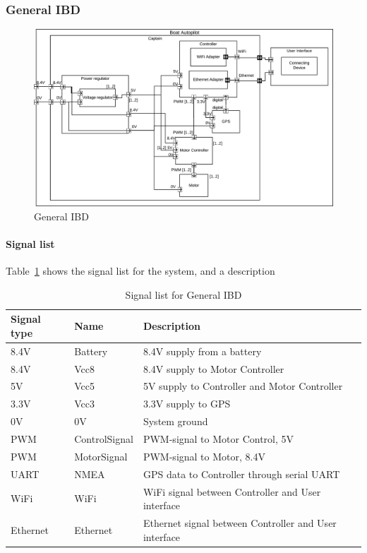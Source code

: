 \subsubsection{General IBD}
\label{sec:general_ibd}
\begin{figure}[H]
	\centering
	\includegraphics[width=1\linewidth]{Images/System_architecture/General_IBD}
	\caption{General IBD}
	\label{fig:general_ibd}
\end{figure}

\paragraph{Signal list}


Table~\ref{table:general_ibd} shows the signal list for the system, and a description
\begin{table}[htbp]
	\centering
	\begin{tabular}{|l|l|l|}
		\hline
		\textbf{Signal type} 	&\textbf{Name}		&\textbf{Description} \\\hline
		8.4V			&Battery	&8.4V supply from a battery\\\hline
		
		8.4V			&Vcc8		&8.4V supply to Motor Controller\\\hline
		5V			&Vcc5		&5V supply to Controller and Motor Controller\\\hline
		3.3V			&Vcc3		&3.3V supply to GPS\\\hline
		0V			&0V			&System ground\\\hline
		PWM	&ControlSignal	&PWM-signal to Motor Control, 5V\\\hline
		PWM	&MotorSignal	&PWM-signal to Motor, 8.4V\\\hline
		UART		&NMEA		&GPS data to Controller through serial UART\\\hline	
		WiFi		&WiFi		&WiFi signal between Controller and User interface\\\hline
		Ethernet	&Ethernet	&Ethernet signal between Controller and User interface\\\hline
		
		
	\end{tabular}
	\caption{Signal list for General IBD}
	\label{table:general_ibd}
\end{table}

